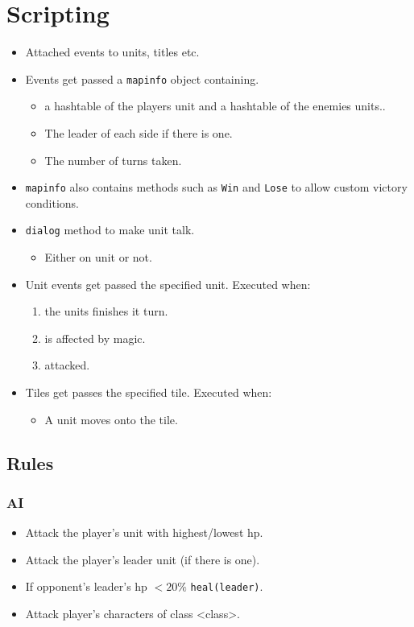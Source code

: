 \section{Scripting}
\label{sec:Scripting}
\begin{itemize}


\item Attached events to units, titles etc.

\item Events get passed a \texttt{mapinfo} object containing.
\begin{itemize}
	\item a hashtable of the players unit and a hashtable of the enemies units..
	\item The leader of each side if there is one.
	\item The number of turns taken.
\end{itemize}

\item \texttt{mapinfo} also contains methods such as \texttt{Win} and \texttt{Lose} to allow custom victory conditions.

\item \texttt{dialog} method to make unit talk.
\begin{itemize}
	\item Either on unit or not.
\end{itemize}

\item Unit events get passed the specified unit. Executed when:
\begin{enumerate}
	\item the units finishes it turn.
	\item is affected by magic.
	\item attacked.
\end{enumerate}

\item Tiles get passes the specified tile. Executed when:
\begin{itemize}
	\item A unit moves onto the tile.
\end{itemize}

\end{itemize}

\subsection{Rules}
\subsubsection{AI}
\begin{itemize}
	\item Attack the player's unit with  highest/lowest hp.
	\item Attack the player's leader unit (if there is one).
	\item If opponent's leader's hp $< 20\%$ \texttt{heal(leader)}.
	\item Attack player's characters of class <class>.
\end{itemize}

